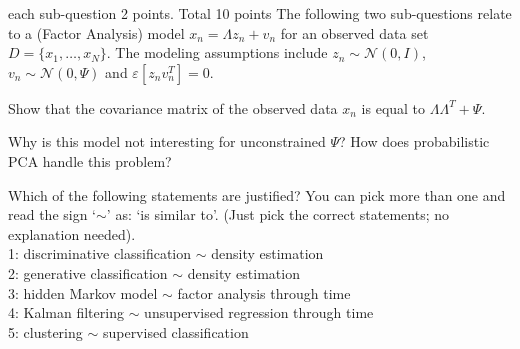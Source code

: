 \documentclass[a4paper]{article}
\newcommand{\tjboxed}[1]{}
\begin{document}
\begin{exam}
\begin{vraag}{each sub-question 2 points. Total 10 points}
  The following two sub-questions relate to a (Factor Analysis) model $x_n=\Lambda z_n + v_n$ for an observed data set $D=\{x_1,\dots,x_N\}$. The modeling assumptions include $z_n \sim \mathcal{N}(0,I)$, $v_n \sim \mathcal{N}(0,\Psi)$ and $\varepsilon[z_nv_n^T]=0$.

\begin{deelvraag}
Show that the covariance matrix of the observed data $x_n$ is equal to $\Lambda\Lambda^T + \Psi$.
\tjboxed{
\begin{align*}
\epsilon[x] &= \epsilon[\Lambda z + v] = \Lambda \epsilon[z] + \epsilon[v] = 0\\
\var[x] &= \epsilon[(x-\epsilon[x])(x-\epsilon[x])^T] =  \epsilon[(\Lambda z +v)(\Lambda z +v)^T] \\
    &= \Lambda \epsilon[zz^T] \Lambda^T + \epsilon[vv^T] = \Lambda \Lambda^T + \Psi
\end{align*}
}%
\end{deelvraag}

\begin{deelvraag} Why is this model not interesting for unconstrained $\Psi$? How does probabilistic PCA handle this problem?
\tjboxed{
(a) Because setting $\Lambda=0$ would result in a `regular' gaussian model with covariance matrix $\Psi$; i.o.w. it's no more interesting than any other gaussian model.\\
(b) If $\Psi$ is diagonal, then all correlations between the components in $x$ \emph{must} be absorbed ('explained') by the rank-$K$ matrix $\Lambda \Lambda^T$. In pPCA, this is achieved by the constraint $\Psi=\sigma^2 I$.
}%
\end{deelvraag}

\begin{deelvraag}
Which of the following statements are justified? You can pick more than one and read the sign `$\sim$' as: `is similar to'. (Just pick the correct statements; no explanation needed).\\
1: discriminative classification $\sim$ density estimation\\
2: generative classification $\sim$ density estimation\\
3: hidden Markov model $\sim$ factor analysis through time\\
4: Kalman filtering $\sim$ unsupervised regression through time\\
5: clustering $\sim$ supervised classification
\tjboxed{
2 and 4 are correct.
}%
\end{deelvraag}



\end{vraag}
\end{exam}
\end{document}
